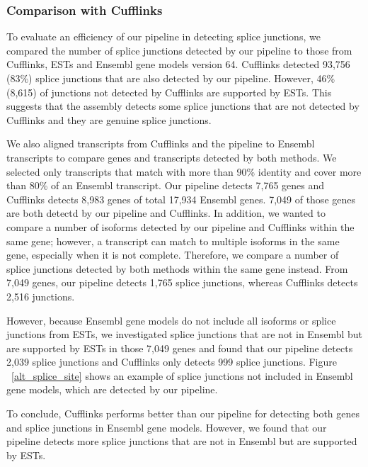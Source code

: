 \documentclass[10pt]{article}
\begin{document}
\subsubsection*{Comparison with Cufflinks}
To evaluate an efficiency of our pipeline in detecting splice junctions,
we compared the number of splice junctions detected by our pipeline to those from Cufflinks\cite{Trapnell:2010kd}, ESTs and
Ensembl gene models version 64.
Cufflinks detected 93,756 (83\%) splice junctions that are also detected by our pipeline.
However, 46\% (8,615) of junctions not detected by Cufflinks are supported by ESTs.
This suggests that the assembly detects some splice junctions that are not detected by Cufflinks and they are
genuine splice junctions.

We also aligned transcripts from Cufflinks and the pipeline to Ensembl transcripts to compare genes and transcripts detected by
both methods.
We selected only transcripts that match with more than 90\% identity and cover more than 80\% of an Ensembl transcript.
Our pipeline detects 7,765 genes and Cufflinks detects 8,983 genes of total 17,934 Ensembl genes.
7,049 of those genes are both detectd by our pipeline and Cufflinks.
In addition, we wanted to compare a number of isoforms detected by our pipeline and Cufflinks within the same gene; however,
a transcript can match to multiple isoforms in the same gene, especially when it is not complete.
Therefore, we compare a number of splice junctions detected by both methods within the same gene instead.
From 7,049 genes, our pipeline detects 1,765 splice junctions, whereas Cufflinks detects 2,516 junctions.

However, because Ensembl gene models do not include all isoforms or splice junctions from ESTs, we investigated splice junctions
that are not in Ensembl but are supported by ESTs in those 7,049 genes and found that our pipeline detects 2,039 splice junctions
and Cufflinks only detects 999 splice junctions. Figure ~\ref{alt_splice_site} shows an example of splice junctions not included in Ensembl gene models, which are detected by our pipeline.

To conclude, Cufflinks performs better than our pipeline for detecting both genes and splice junctions in Ensembl gene models.
However, we found that our pipeline detects more splice junctions that are not in Ensembl but are supported by ESTs.
\end{document}
